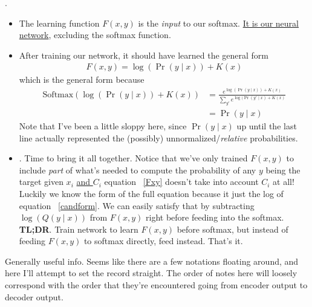 \documentclass[11pt]{article}
\begin{document}
\myspace
\p {}. 
\begin{itemize}
	\item The learning function $F(x, y)$ is the \textit{input} to our softmax. \underline{It is our neural network}, excluding the softmax function. 
	
	\item After training our network, it should have learned the general form
	\begin{align}
	F(x, y) = \log( \Pr( y \mid x) )  + 
	K(x) \label{Fxy}
	\end{align}
	which is the general form because
	\begin{align}
	\text{Softmax}(\log(\Pr(y \mid x)) + K(x)) 
	&= 
	\frac{ e^{\log(\Pr(y \mid x)) + K(x)}   }{
		\sum_{y'} e^{\log(\Pr(y' \mid x) + K(x) }} \\
	&= \Pr(y \mid x)	
	\end{align}
	Note that I've been a little sloppy here, since $\Pr(y \mid x)$ up until the last line actually represented the (possibly) unnormalized/\textit{relative} probabilities. 
	
	\item {\footnotesize {}}. Time to bring it all together. Notice that we've only trained $F(x, y)$ to include \textit{part} of what's needed to compute the probability of any $y$ being the target given $x_i$ \underline{and $C_i$} \textellipsis equation ~\ref{Fxy} doesn't take into account $C_i$ at all! Luckily we know the form of the full equation because it just the log of equation ~\ref{candform}. We can easily satisfy that by subtracting $\log(Q(y\mid x))$ from $F(x, y)$ right before feeding into the softmax. \\
	
	\p\textbf{TL;DR}. Train network to learn $F(x, y)$ before softmax, but instead of feeding $F(x, y)$ to softmax directly, feed 
	instead. That's it.
\end{itemize}





Generally useful info. Seems like there are a few notations floating around, and here I'll attempt to set the record straight. The order of notes here will loosely correspond with the order that they're encountered going from encoder output to decoder output.\\
\end{document}
